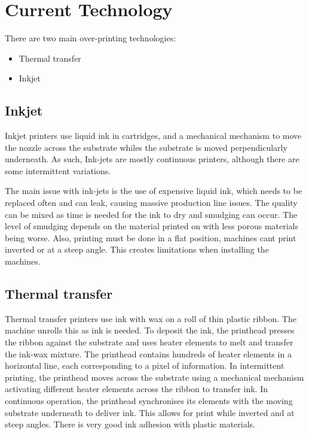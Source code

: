 \chapter{Current Technology}
\pagestyle{fancy}

There are two main over-printing technologies:

\begin{itemize}
    \item Thermal transfer
    \item Inkjet
  \end{itemize}

  \section{Inkjet}

  Inkjet printers use liquid ink in cartridges, and a  mechanical mechanism to move the nozzle across the substrate whiles the substrate is moved perpendicularly underneath. As such, Ink-jets are mostly continuous printers, although there are some intermittent variations.

  The main issue with ink-jets is the use of expensive liquid ink, which needs to be replaced often and can leak, causing massive production line issues. The quality can be mixed as time is needed for the ink to dry and smudging can occur. The level of smudging depends on the material printed on with less porous materials being worse. Also, printing must be done in a flat position, machines cant print inverted or at a steep angle. This creates limitations when installing the machines.


  \section{Thermal transfer}

  Thermal transfer printers use ink with wax on a roll of thin plastic ribbon. The machine unrolls this as ink is needed. To deposit the ink, the printhead presses the ribbon against the substrate and uses heater elements to melt and transfer the ink-wax mixture. 
  The printhead contains hundreds of heater elements in a horizontal line, each corresponding to a pixel of information.
  In intermittent printing, the printhead moves across the substrate using a mechanical mechanism activating different heater elements across the ribbon to transfer ink. 
  In continuous operation, the printhead synchronises its elements with the moving substrate underneath to deliver ink. This allows for print while inverted and at steep angles. There is very good ink adhesion with plastic materials. 
  

